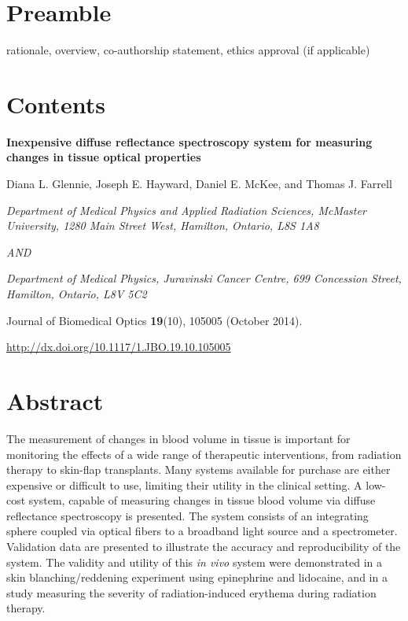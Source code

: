 \section*{Preamble}
rationale, overview, co-authorship statement, ethics approval (if applicable)

\section*{Contents}

\begin{center}

\textbf{Inexpensive diffuse reflectance spectroscopy system for measuring changes in tissue optical properties}

Diana L. Glennie, Joseph E. Hayward, Daniel E. McKee, and Thomas J. Farrell

\textit{Department of Medical Physics and Applied Radiation Sciences, McMaster University, 1280 Main Street West, Hamilton, Ontario, L8S 1A8}

\textit{AND}

\textit{Department of Medical Physics, Juravinski Cancer Centre, 699 Concession Street, Hamilton, Ontario, L8V 5C2}

\end{center}

\noindent Journal of Biomedical Optics \textbf{19}(10), 105005 (October 2014).

\noindent \url{http://dx.doi.org/10.1117/1.JBO.19.10.105005}

\section*{Abstract}
The measurement of changes in blood volume in tissue is important for monitoring the effects of a wide range of therapeutic interventions, from radiation therapy to skin-flap transplants. Many systems available for purchase are either expensive or difficult to use, limiting their utility in the clinical setting. A low-cost system, capable of measuring changes in tissue blood volume via diffuse reflectance spectroscopy is presented. The system consists of an integrating sphere coupled via optical fibers to a broadband light source and a spectrometer. Validation data are presented to illustrate the accuracy and reproducibility of the system. The validity and utility of this \emph{in vivo} system were demonstrated in a skin blanching/reddening experiment using epinephrine and lidocaine, and in a study measuring the severity of radiation-induced erythema during radiation therapy.

